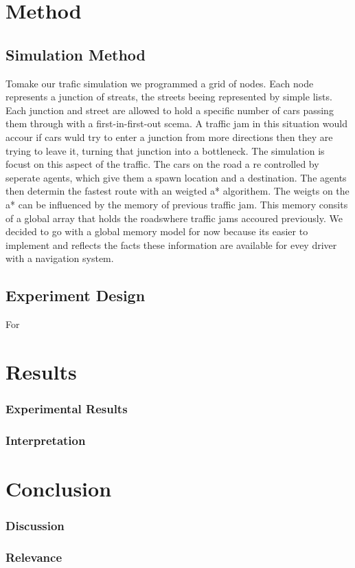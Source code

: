 \documentclass{article}
\begin{document}
\section{Method}

  \subsection{Simulation Method}
Tomake our trafic simulation we programmed a grid of nodes. Each node represents a junction of streats, the streets beeing represented by simple lists. Each junction and street are allowed to hold a specific number of cars passing them through with a first-in-first-out scema. A traffic jam in this situation would accour if cars wuld try to enter a junction from more directions then they are trying to leave it, turning that junction into a bottleneck. The simulation is focust on this aspect of the traffic. The cars on the road a re controlled by seperate agents, which give them a spawn location and a destination. The agents then determin the fastest route with an weigted a* algorithem. The weigts on the a* can be influenced by the memory of previous traffic jam. This memory consits of a global array that holds the roadswhere traffic jams accoured previously. We decided to go with a global memory model for now because its easier to implement and reflects the facts these information are available for evey driver with a navigation system. 

  \subsection{Experiment Design}
For

\section{Results}

	\subsubsection{Experimental Results}
	
	\subsubsection{Interpretation}
  

\section{Conclusion}

	\subsubsection{Discussion}

	\subsubsection{Relevance}



\end{document}
